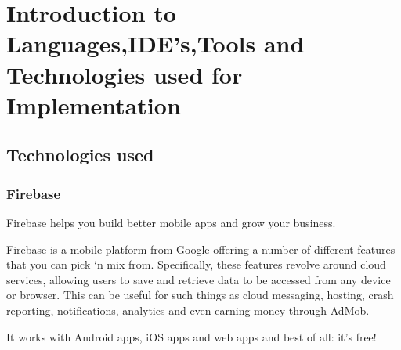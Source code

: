 \section{Introduction to Languages,IDE’s,Tools and Technologies used for Implementation}
	
\subsection{Technologies used}

\subsubsection{Firebase}

Firebase helps you build better mobile apps and grow your business.

Firebase is a mobile platform from Google offering a number of different features that you can pick ‘n mix from. Specifically, these features revolve around cloud services, allowing users to save and retrieve data to be accessed from any device or browser. This can be useful for such things as cloud messaging, hosting, crash reporting, notifications, analytics and even earning money through AdMob.

It works with Android apps, iOS apps and web apps and best of all: it’s free!

